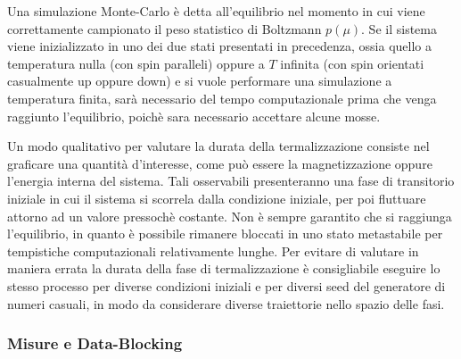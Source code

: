 Una simulazione Monte-Carlo è detta all'equilibrio nel momento in cui viene correttamente campionato il peso statistico di Boltzmann 
$p\left(\mu\right)$. Se il sistema viene inizializzato in uno dei due stati presentati in precedenza, ossia quello a temperatura 
nulla (con spin paralleli) oppure a $T$ infinita (con spin orientati casualmente up oppure down) e si vuole performare una simulazione a 
temperatura finita, sarà necessario del tempo computazionale prima che venga raggiunto l'equilibrio, poichè sara necessario accettare 
alcune mosse.

Un modo qualitativo per valutare la durata della termalizzazione consiste nel graficare una quantità d'interesse, 
come può essere la magnetizzazione oppure l'energia interna del sistema. Tali osservabili presenteranno una fase di transitorio 
iniziale in cui il sistema si scorrela dalla condizione iniziale, per poi fluttuare attorno ad un valore pressochè costante. Non è 
sempre garantito che si raggiunga l'equilibrio, in quanto è possibile rimanere bloccati in uno stato metastabile per tempistiche 
computazionali relativamente lunghe. Per evitare di valutare in maniera errata la durata della fase di termalizzazione è consigliabile 
eseguire lo stesso processo per diverse condizioni iniziali e per diversi seed del generatore di numeri casuali, in modo da considerare 
diverse traiettorie nello spazio delle fasi.  




\subsubsection{Misure e Data-Blocking}

